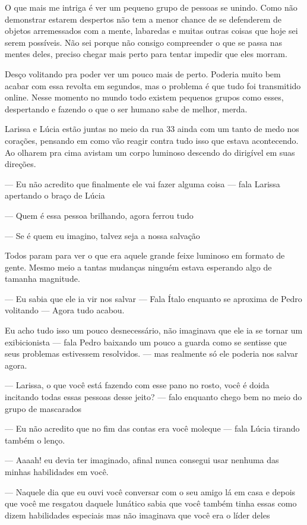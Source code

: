 O que mais me intriga é ver um pequeno grupo de pessoas se unindo. Como não demonstrar estarem despertos não tem a menor chance de se defenderem de objetos arremessados com a mente, labaredas e muitas outras coisas que hoje sei serem possíveis. Não sei porque não consigo compreender o que se passa nas mentes deles, preciso chegar mais perto para tentar impedir que eles morram.

Desço volitando pra poder ver um pouco mais de perto. Poderia muito bem acabar com essa revolta em segundos, mas o problema é que tudo foi transmitido online. Nesse momento no mundo todo existem pequenos grupos como esses, despertando e fazendo o que o ser humano sabe de melhor, merda.

Larissa e Lúcia estão juntas no meio da rua 33 ainda com um tanto de medo nos corações, pensando em como vão reagir contra tudo isso que estava acontecendo. Ao olharem pra cima avistam um corpo luminoso descendo do dirigível em suas direções.

— Eu não acredito que finalmente ele vai fazer alguma coisa — fala Larissa apertando o braço de Lúcia

— Quem é essa pessoa brilhando, agora ferrou tudo

— Se é quem eu imagino, talvez seja a nossa salvação

Todos param para ver o que era aquele grande feixe luminoso em formato de gente. Mesmo meio a tantas mudanças ninguém estava esperando algo de tamanha magnitude.

— Eu sabia que ele ia vir nos salvar — Fala Ítalo enquanto se aproxima de Pedro volitando — Agora tudo acabou.

Eu acho tudo isso um pouco desnecessário, não imaginava que ele ia se tornar um exibicionista — fala Pedro baixando um pouco a guarda como se sentisse que seus problemas estivessem resolvidos. — mas realmente só ele poderia nos salvar agora.

— Larissa, o que você está fazendo com esse pano no rosto, você é doida incitando todas essas pessoas desse jeito? — falo enquanto chego bem no meio do grupo de mascarados

— Eu não acredito que no fim das contas era você moleque — fala Lúcia tirando também o lenço.

— Aaaah! eu devia ter imaginado, afinal nunca consegui usar nenhuma das minhas habilidades em você.

— Naquele dia que eu ouvi você conversar com o seu amigo lá em casa e depois que você me resgatou daquele lunático sabia que você também tinha essas como dizem habilidades especiais mas não imaginava que você era o líder deles

